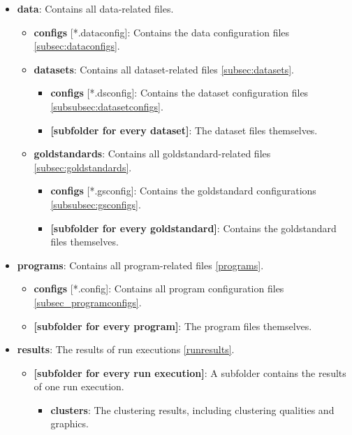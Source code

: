			\begin{itemize}[noitemsep]
				\item \textbf{data}: Contains all data-related files.
				\begin{itemize}[noitemsep,nolistsep]
					\item \textbf{configs} [*.dataconfig]: Contains the data configuration files \ref{subsec:dataconfigs}.
					\item \textbf{datasets}: Contains all dataset-related files \ref{subsec:datasets}.
					\begin{itemize}[noitemsep,nolistsep]
						\item \textbf{configs} [*.dsconfig]: Contains the dataset configuration files \ref{subsubsec:datasetconfigs}.
						\item \textbf{[subfolder for every dataset]}: The dataset files themselves.
					\end{itemize}
					\item \textbf{goldstandards}: Contains all goldstandard-related files \ref{subsec:goldstandards}.
					\begin{itemize}[noitemsep,nolistsep]		
						\item \textbf{configs} [*.gsconfig]: Contains the goldstandard configurations \ref{subsubsec:gsconfigs}.
						\item \textbf{[subfolder for every goldstandard]}: Contains the goldstandard files themselves.
					\end{itemize}
				\end{itemize}
				\item \textbf{programs}: Contains all program-related files \ref{programs}.
				\begin{itemize}[noitemsep,nolistsep]
					\item \textbf{configs} [*.config]: Contains all program configuration files \ref{subsec_programconfigs}.
					\item \textbf{[subfolder for every program]}: The program files themselves.
				\end{itemize}
				\item \textbf{results}: The results of run executions \ref{runresults}.
				\begin{itemize}[noitemsep,nolistsep]
					\item \textbf{[subfolder for every run execution]}: A subfolder contains the results of one run execution.
					\begin{itemize}[noitemsep,nolistsep]
						\item \textbf{clusters}: The clustering results, including clustering qualities and graphics.

\end{itemize}
\end{itemize}
\end{itemize}
